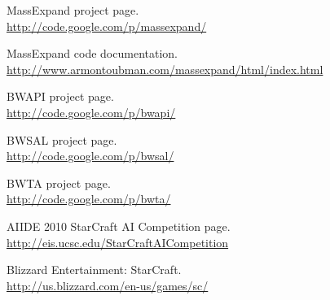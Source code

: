 
\nocite{*}

\begin{thebibliography}{99}

	MassExpand project page.\\
	\url{http://code.google.com/p/massexpand/}

	MassExpand code documentation.\\
	\url{http://www.armontoubman.com/massexpand/html/index.html}

	BWAPI project page.\\
	\url{http://code.google.com/p/bwapi/}

	BWSAL project page.\\
	\url{http://code.google.com/p/bwsal/}

	BWTA project page.\\
	\url{http://code.google.com/p/bwta/}

	AIIDE 2010 StarCraft AI Competition page.\\
	\url{http://eis.ucsc.edu/StarCraftAICompetition}

	Blizzard Entertainment: StarCraft.\\
	\url{http://us.blizzard.com/en-us/games/sc/}

\end{thebibliography}